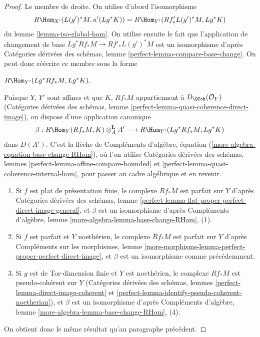 \begin{proof}
\medskip\noindent
Le membre de droite. On utilise d'abord l'isomorphisme
$$
R\Hom_{X'}(L(g')^*M, a'(Lg^*K)) = R\Hom_{Y'}(Rf'_*L(g')^*M, Lg^*K)
$$
du lemme \ref{lemma-iso-global-hom}. On utilise ensuite le fait que l'application de changement de base $Lg^*Rf_*M \to Rf'_*L(g')^*M$ est un isomorphisme d'après Catégories dérivées des schémas, lemme \ref{perfect-lemma-compare-base-change}. On peut donc réécrire ce membre sous la forme
\par\noindent\hfil
$R\Hom_{Y'}(Lg^*Rf_*M, Lg^*K)$.
\hfil\par\noindent
Puisque $Y$, $Y'$ sont affines et que $K$, $Rf_*M$ appartiennent à $D_\QCoh(\mathcal{O}_Y)$ (Catégories dérivées des schémas, lemme \ref{perfect-lemma-quasi-coherence-direct-image}), on dispose d'une application canonique
$$
\beta :
R\Hom_Y(Rf_*M, K) \otimes^\mathbf{L}_A A'
\longrightarrow
R\Hom_{Y'}(Lg^*Rf_*M, Lg^*K)
$$
dans $D(A')$. C'est la flèche de Compléments d'algèbre, équation (\ref{more-algebra-equation-base-change-RHom}), où l'on utilise Catégories dérivées des schémas, lemmes \ref{perfect-lemma-affine-compare-bounded} et \ref{perfect-lemma-quasi-coherence-internal-hom}, pour passer au cadre algébrique et en revenir.
\begin{enumerate}
\item Si $f$ est plat de présentation finie, le complexe $Rf_*M$ est parfait sur $Y$ d'après Catégories dérivées des schémas, lemme \ref{perfect-lemma-flat-proper-perfect-direct-image-general}, et $\beta$ est un isomorphisme d'après Compléments d'algèbre, lemme \ref{more-algebra-lemma-base-change-RHom}, (1).
\item Si $f$ est parfait et $Y$ noethérien, le complexe $Rf_*M$ est parfait sur $Y$ d'après Compléments sur les morphismes, lemme \ref{more-morphisms-lemma-perfect-proper-perfect-direct-image}, et $\beta$ est un isomorphisme comme précédemment.
\item Si $g$ est de Tor-dimension finie et $Y$ est noethérien, le complexe $Rf_*M$ est pseudo-cohérent sur $Y$ (Catégories dérivées des schémas, lemmes \ref{perfect-lemma-direct-image-coherent} et \ref{perfect-lemma-identify-pseudo-coherent-noetherian}), et $\beta$ est un isomorphisme d'après Compléments d'algèbre, lemme \ref{more-algebra-lemma-base-change-RHom}, (4).
\end{enumerate}
On obtient donc le même résultat qu'au paragraphe précédent.


\end{proof}
